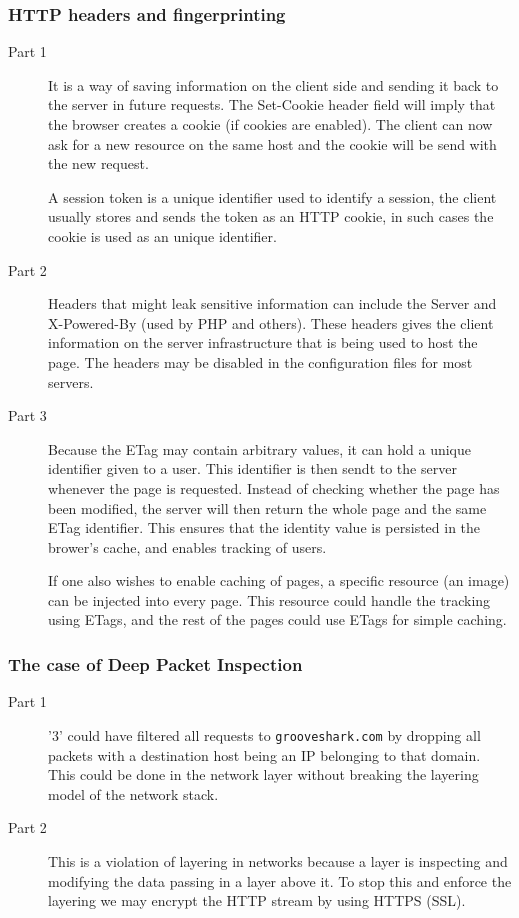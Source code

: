\documentclass[a4paper]{article}
\begin{document}
\subsubsection{HTTP headers and fingerprinting}
\begin{description}
\item[Part 1] It is a way of saving information on the client side and sending
    it back to the server in future requests. The Set-Cookie header field will
    imply that the browser creates a cookie (if cookies are enabled). The
    client can now ask for a new resource on the same host and the cookie will
    be send with the new request.
    
    A session token is a unique identifier used to identify a session, the
    client usually stores and sends the token as an HTTP cookie, in such cases
    the cookie is used as an unique identifier.

\item[Part 2] Headers that might leak sensitive information can include the Server and X-Powered-By (used by PHP and others). These
    headers gives the client information on the server infrastructure that is being used to host the page. The headers may be disabled
    in the configuration files for most servers.
\item[Part 3] Because the ETag may contain arbitrary values, it can hold a unique identifier given to a user. This identifier
    is then sendt to the server whenever the page is requested. Instead of checking whether the page has been modified, the server
    will then return the whole page and the same ETag identifier. This ensures that the identity value is persisted in the brower's
    cache, and enables tracking of users.

    If one also wishes to enable caching of pages, a specific resource (an image) can be injected into every page. This resource could handle
    the tracking using ETags, and the rest of the pages could use ETags for simple caching.
\end{description}

\subsubsection{The case of Deep Packet Inspection}

\begin{description}
    \item[Part 1] '3' could have filtered all requests to
        \texttt{grooveshark.com} by dropping all packets with a destination
        host being an IP belonging to that domain. This could be done in the
        network layer without breaking the layering model of the network stack.
    \item[Part 2] This is a violation of layering in networks because a layer
        is inspecting and modifying the data passing in a layer above it. To
        stop this and enforce the layering we may encrypt the HTTP stream by
        using HTTPS (SSL).
\end{description}


\end{document}
